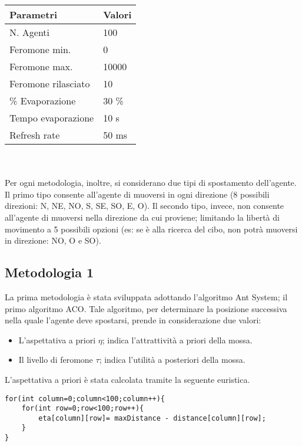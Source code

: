 \documentclass[12pt,a4paper,openright,twoside]{report}
\begin{document}
\begin{tabular}{p{5cm}|p{5cm}} 
	 \textbf{ Parametri} & \textbf{ Valori} \\ \hline
	 N. Agenti & 100 \\
	 Feromone min. & 0 \\
	 Feromone max. & 10000 \\
	 Feromone rilasciato & 10\\
	 \% Evaporazione & 30 \% \\
	 Tempo evaporazione & 10 s \\
	 Refresh rate & 50 ms 
\end{tabular}
\\\\
Per ogni metodologia, inoltre, si considerano due tipi di spostamento dell'agente. Il primo tipo consente all'agente di muoversi in ogni direzione (8 possibili direzioni: N, NE, NO, S, SE, SO, E, O). Il secondo tipo, invece, non consente all'agente di muoversi nella direzione da cui proviene; limitando la libertà di movimento a 5 possibili opzioni (es: se è alla ricerca del cibo, non potrà muoversi in direzione: NO, O e SO).
\subsection{Metodologia 1}

La prima metodologia è stata sviluppata adottando l'algoritmo Ant System; il primo algoritmo ACO.
Tale algoritmo, per determinare la posizione successiva nella quale l'agente deve spostarsi, prende in considerazione due valori:

\begin{itemize}
	\item L'aspettativa a priori $\eta$; indica l'attrattività a priori della mossa.
	\item Il livello di feromone $\tau$; indica l'utilità a posteriori della mossa.
\end{itemize}

L'aspettativa a priori è stata calcolata tramite la seguente euristica. \\

\begin{verbatim}
for(int column=0;column<100;column++){
    for(int row=0;row<100;row++){
        eta[column][row]= maxDistance - distance[column][row];
    }
}
\end{verbatim}
\end{document}
